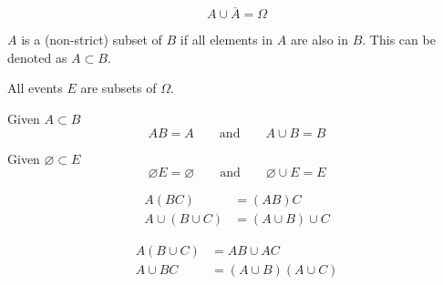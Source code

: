 \documentclass{article}
\begin{document}
\begin{theorem}
    \begin{equation*}
        A \cup \overline{A} = \Omega
    \end{equation*}
\end{theorem}
\begin{definition}[Subset]
    \(A\) is a (non-strict) subset of \(B\) if all elements in \(A\) are also in \(B\).
    This can be denoted as \(A \subset B\).
\end{definition}
\begin{theorem}
    All events \(E\) are subsets of \(\Omega\).
\end{theorem}
\begin{theorem}
    Given \(A \subset B\)
    \begin{equation*}
        AB = A \quad\quad \text{and} \quad\quad A \cup B = B
    \end{equation*}
\end{theorem}
\begin{corollary}
    Given \(\varnothing \subset E\)
    \begin{equation*}
        \varnothing E = \varnothing \quad\quad \text{and} \quad\quad \varnothing \cup E = E
    \end{equation*}
\end{corollary}
\begin{theorem}
    \begin{align*}
        A \left( BC \right)            & = \left( AB \right) C            \\
        A \cup \left( B \cup C \right) & = \left( A \cup B \right) \cup C
    \end{align*}
\end{theorem}
\begin{theorem}
    \begin{align*}
        A \left(B \cup C\right) & = AB \cup AC                                      \\
        A \cup BC               & = \left( A \cup B \right) \left( A \cup C \right)
    \end{align*}
\end{theorem}
\end{document}

